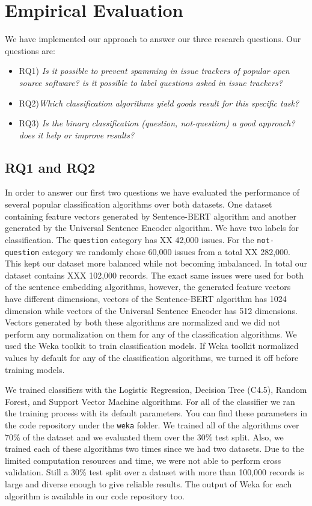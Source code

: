 \documentclass[conference]{IEEEtran}
\begin{document}
\section{Empirical Evaluation}\label{eval}
We have implemented our approach to answer our three research questions. Our questions are:
\begin{itemize}
  \item{RQ1)} \textit{Is it possible to prevent spamming in issue trackers of popular open source software? 
  is it possible to label questions asked in issue trackers?}
  \item{RQ2)}\textit{Which classification algorithms yield goods result for this specific task?}
  \item{RQ3)} \textit{Is the binary classification (question, not-question) a good approach? 
  does it help or improve results?}
\end{itemize}

\subsection{RQ1 and RQ2}
In order to answer our first two questions we have evaluated the performance of several popular
classification algorithms over both datasets. One dataset containing feature vectors generated by 
Sentence-BERT algorithm and another generated by the Universal Sentence Encoder algorithm. We have two labels for
classification. The \verb|question| category has XX 42,000 issues. For the \verb|not-question| category 
we randomly chose 60,000 issues from a total XX 282,000. This kept our dataset more balanced while 
not becoming imbalanced. In total our dataset contains XXX 102,000 records. The exact same issues were used 
for both of the sentence embedding algorithms, however, the generated feature vectors have different dimensions, 
vectors of the Sentence-BERT algorithm has 1024 dimension while vectors of the Universal Sentence Encoder has 
512 dimensions. Vectors generated by both these algorithms are normalized and we did not perform any normalization
on them for any of the classification algorithms. We used the Weka toolkit to train classification models. 
If Weka toolkit normalized values by default for any of the classification algorithms, 
we turned it off before training models. 

We trained classifiers with the Logistic Regression, Decision Tree (C4.5), Random Forest, and Support Vector Machine
algorithms. For all of the classifier we ran the training process with its default parameters. You can find 
these parameters in the code repository under the \verb|weka| folder. We trained all of the algorithms over 70\%
of the dataset and we evaluated them over the 30\% test split. Also, we trained each of these algorithms two 
times since we had two datasets. Due to the limited computation resources and time, we were not able to 
perform cross validation. Still a 30\% test split over a dataset with more than 100,000 records is large 
and diverse enough to give reliable results.
The output of Weka for each algorithm is available in our code repository too. 
\end{document}
